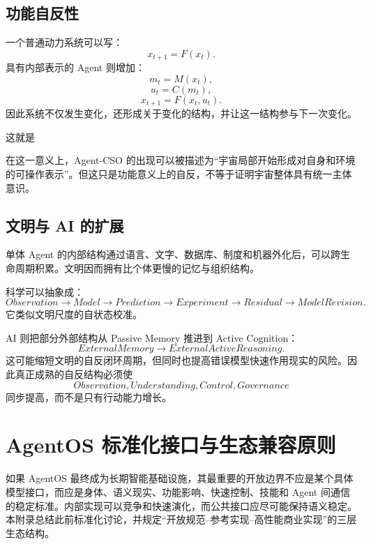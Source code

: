 \section{功能自反性}

一个普通动力系统可以写：
\[
x_{t+1}=F(x_t).
\]
具有内部表示的 Agent 则增加：
\[
m_t=M(x_t),
\]
\[
u_t=C(m_t),
\]
\[
x_{t+1}=F(x_t,u_t).
\]
因此系统不仅发生变化，还形成关于变化的结构，并让这一结构参与下一次变化。

这就是
\begin{statementbox}
\centering
{}
\end{statementbox}

在这一意义上，Agent-CSO 的出现可以被描述为“宇宙局部开始形成对自身和环境的可操作表示”。但这只是功能意义上的自反，不等于证明宇宙整体具有统一主体意识。

\section{文明与 AI 的扩展}

单体 Agent 的内部结构通过语言、文字、数据库、制度和机器外化后，可以跨生命周期积累。文明因而拥有比个体更慢的记忆与组织结构。

科学可以抽象成：
\[
Observation
\rightarrow
Model
\rightarrow
Prediction
\rightarrow
Experiment
\rightarrow
Residual
\rightarrow
ModelRevision.
\]
它类似文明尺度的自状态校准。

AI 则把部分外部结构从 Passive Memory 推进到 Active Cognition：
\[
ExternalMemory
\rightarrow
ExternalActiveReasoning.
\]
这可能缩短文明的自反闭环周期，但同时也提高错误模型快速作用现实的风险。因此真正成熟的自反结构必须使
\[
Observation,
Understanding,
Control,
Governance
\]
同步提高，而不是只有行动能力增长。


\chapter{AgentOS 标准化接口与生态兼容原则}
\label{app:standards}

\begin{chapterlead}
如果 AgentOS 最终成为长期智能基础设施，其最重要的开放边界不应是某个具体模型接口，而应是身体、语义现实、功能影响、快速控制、技能和 Agent 间通信的稳定标准。内部实现可以竞争和快速演化，而公共接口应尽可能保持语义稳定。本附录总结此前标准化讨论，并规定“开放规范--参考实现--高性能商业实现”的三层生态结构。
\end{chapterlead}

